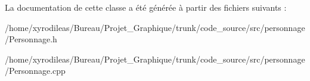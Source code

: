 La documentation de cette classe a été générée à partir des fichiers suivants \-:\begin{DoxyCompactItemize}
\item 
/home/xyrodileas/\-Bureau/\-Projet\-\_\-\-Graphique/trunk/code\-\_\-source/src/personnage/Personnage.\-h\item 
/home/xyrodileas/\-Bureau/\-Projet\-\_\-\-Graphique/trunk/code\-\_\-source/src/personnage/Personnage.\-cpp\end{DoxyCompactItemize}
